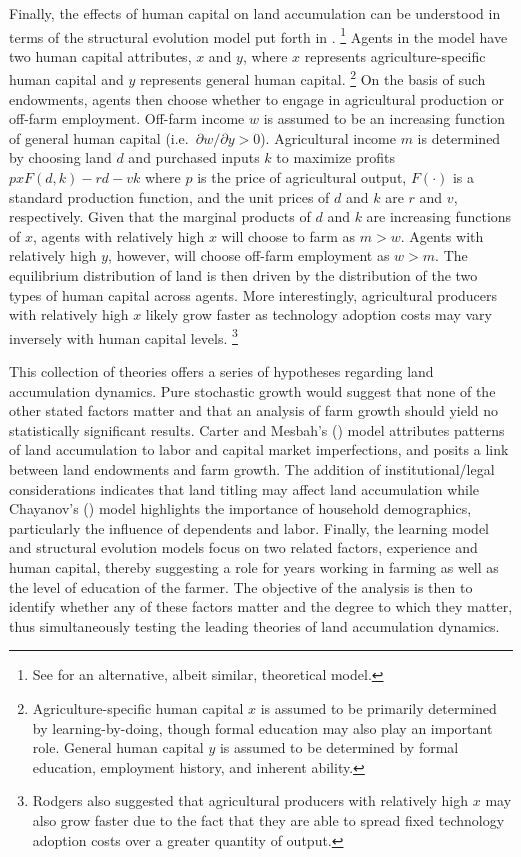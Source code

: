 \documentclass[english]{article}
\begin{document}
Finally, the effects of human capital on land accumulation can be understood
in terms of the structural evolution model put forth in \citet{rodgers1994}.%
\footnote{See \citet{sumner1987} for an alternative, albeit similar, theoretical
model.}
Agents in the model have two human capital attributes, $x$ and $y$, where
$x$ represents agriculture-specific human capital and $y$ represents general 
human capital.%
\footnote{Agriculture-specific human capital $x$ is assumed to be primarily 
determined by learning-by-doing, though formal education may also play an 
important role. 
General human capital $y$ is assumed to be determined by formal education, 
employment history, and inherent ability.}
On the basis of such endowments, agents then choose whether to engage in 
agricultural production or off-farm employment.
Off-farm income $w$ is assumed to be an increasing function of general
human capital (i.e.\ $\partial w/ \partial y > 0$). 
Agricultural income $m$ is determined by choosing land $d$ and purchased 
inputs $k$ to maximize profits $p x F(d,k) - rd - vk$ where $p$ is the price 
of agricultural output, $F(\cdot)$ is a standard production function, 
and the unit prices of $d$ and $k$ are $r$ and $v$, respectively.
Given that the marginal products of $d$ and $k$ are increasing functions of 
$x$, agents with relatively high $x$ will choose to farm as $m > w$.
Agents with relatively high $y$, however, will choose off-farm employment
 as $w > m$.
The equilibrium distribution of land is then driven by the distribution of the 
two types of human capital across agents.
More interestingly, agricultural producers with relatively high $x$ likely 
grow faster as technology adoption costs may vary inversely with human 
capital levels.%
\footnote{Rodgers also suggested that agricultural producers with relatively 
high $x$ may also grow faster due to the fact that they are able to spread fixed 
technology adoption costs over a greater quantity of output.}

This collection of theories offers a series of hypotheses regarding land 
accumulation dynamics.
Pure stochastic growth would suggest that none of the other stated factors 
matter and that an analysis of farm growth should yield no statistically
significant results. 
Carter and Mesbah's (\citeyear{carter1993}) model attributes patterns of land 
accumulation to labor and capital market imperfections, and posits a link 
between land endowments and farm growth. 
The addition of institutional/legal considerations indicates that land 
titling may affect land accumulation while Chayanov's 
(\citeyear{chayanov1966}) model highlights the importance of household 
demographics, particularly the influence of dependents and labor. 
Finally, the learning model and structural evolution models focus on two 
related factors, experience and human capital, thereby suggesting a role for 
years working in farming as well as the level of education of the farmer. 
The objective of the analysis is then to identify whether any of these factors 
matter and the degree to which they matter, thus simultaneously testing 
the leading theories of land accumulation dynamics.
\end{document}
